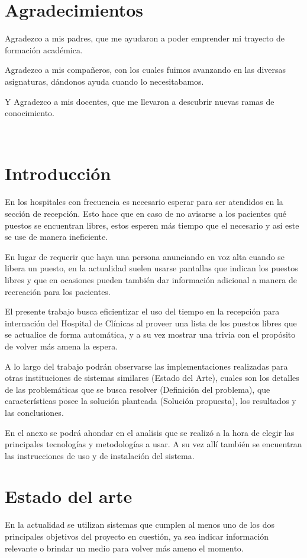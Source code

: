 \documentclass{article}
\begin{document}
\section*{Agradecimientos}

Agradezco a mis padres, que me ayudaron a poder emprender mi trayecto de formación académica.

Agradezco a mis compañeros, con los cuales fuimos avanzando en las diversas asignaturas, dándonos ayuda cuando lo necesitabamos.

Y Agradezco a mis docentes, que me llevaron a descubrir nuevas ramas de conocimiento.
\newpage
\
\newpage
\tableofcontents
\newpage
\
\newpage
\listoffigures
\newpage
\
\newpage
\section{Introducción}
En los hospitales con frecuencia es necesario esperar para ser atendidos en la sección de recepción. Esto hace que en caso de no avisarse a los pacientes qué puestos se encuentran libres, estos esperen más tiempo que el necesario y así este se use de manera ineficiente.

En lugar de requerir que haya una persona anunciando en voz alta cuando se libera un puesto, en la actualidad suelen usarse pantallas que indican los puestos libres y que en ocasiones pueden también dar información adicional a manera de recreación para los pacientes.

El presente trabajo busca eficientizar el uso del tiempo en la recepción para internación del Hospital de Clínicas al proveer una lista de los puestos libres que se actualice de forma automática, y a su vez mostrar una trivia con el propósito de volver más amena la espera.

A lo largo del trabajo podrán observarse las implementaciones realizadas para otras instituciones de sistemas similares (Estado del Arte), cuales son los detalles de las problemáticas que se busca resolver (Definición del problema), que características posee la solución planteada (Solución propuesta), los resultados y las conclusiones.

En el anexo se podrá ahondar en el analisis que se realizó a la hora de elegir las principales tecnologías y metodologías a usar. A su vez allí también se encuentran las instrucciones de uso y de instalación del sistema.
\newpage
\section{Estado del arte}
En la actualidad se utilizan sistemas que cumplen al menos uno de los dos principales objetivos del proyecto en cuestión, ya sea indicar información relevante o brindar un medio para volver más ameno el momento.
\end{document}
